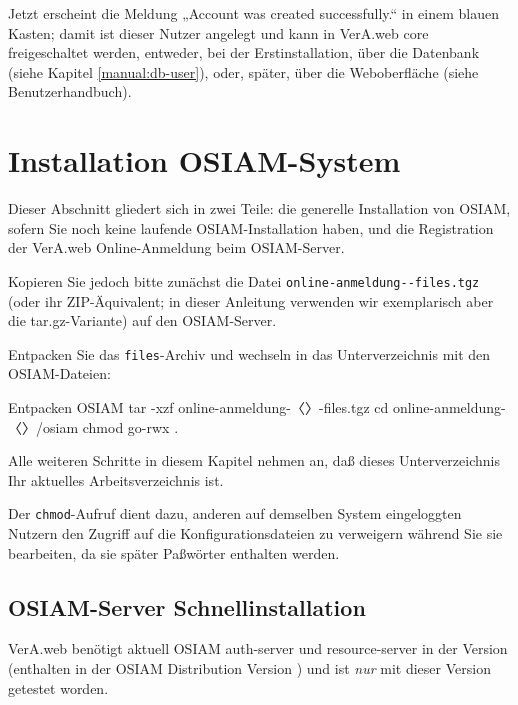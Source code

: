 Jetzt erscheint die Meldung „Account was created successfully.“ in einem
blauen Kasten; damit ist dieser Nutzer angelegt und kann in VerA.web core
freigeschaltet werden, entweder, bei der Erstinstallation, über die
Datenbank (siehe Kapitel \ref{manual:db-user}), oder, später, über die
Weboberfläche (siehe Benutzerhandbuch).

\ifoa
\section{Installation OSIAM-System}\label{sec:setup-osiam}

Dieser Abschnitt gliedert sich in zwei Teile: die generelle Installation
von OSIAM, sofern Sie noch keine laufende OSIAM-Installation haben, und
die Registration der VerA.web Online-Anmeldung beim OSIAM-Server.

Kopieren Sie jedoch bitte zunächst die Datei
\texttt{online-anmeldung-\vwiaverssw{}-files.tgz} (oder ihr
ZIP-Äquivalent; in dieser Anleitung verwenden wir exemplarisch
aber die tar.gz-Variante) auf den OSIAM-Server.

\begin{minipage}{\textwidth}
Entpacken Sie das \texttt{files}-Archiv und wechseln in das
Unterverzeichnis mit den OSIAM-Dateien:

\begin{lstdump}{Entpacken OSIAM}
tar -xzf online-anmeldung-〈\lstdumpesc{\vwiaverssw}〉-files.tgz
cd online-anmeldung-〈\lstdumpesc{\vwiaverssw}〉/osiam
chmod go-rwx .
\end{lstdump}
\end{minipage}

Alle weiteren Schritte in diesem Kapitel nehmen an, daß dieses
Unterverzeichnis Ihr aktuelles Arbeitsverzeichnis ist.

Der \texttt{chmod}-Aufruf dient dazu, anderen auf demselben System
eingeloggten Nutzern den Zugriff auf die Konfigurationsdateien zu
verweigern während Sie sie bearbeiten, da sie später Paßwörter
enthalten werden.

\subsection{OSIAM-Server Schnellinstallation}\label{subsec:setup-osiam-fast}

VerA.web benötigt aktuell OSIAM auth-server und resource-server in
der Version \vwiaversosiam{} (enthalten in der OSIAM Distribution
Version \vwiaversodist{}) und ist \emph{nur} mit dieser Version
getestet worden.

